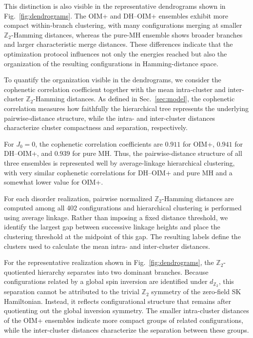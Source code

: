 \documentclass[
reprint,
amsmath,amssymb,
aps,
pre,
floatfix,
]{revtex4-2}
\begin{document}
This distinction is also visible in the representative dendrograms shown in
Fig.~\ref{fig:dendrograms}. The OIM+ and DH--OIM+ ensembles exhibit more
compact within-branch clustering, with many configurations merging at smaller
$\mathbb{Z}_2$-Hamming distances, whereas the pure-MH ensemble shows broader branches and
larger characteristic merge distances. These differences indicate that the
optimization protocol influences not only the energies reached but also the
organization of the resulting configurations in Hamming-distance space.

To quantify the organization visible in the dendrograms, we consider the
cophenetic correlation coefficient together with the mean intra-cluster and
inter-cluster $\mathbb{Z}_2$-Hamming distances. As defined in Sec.~\ref{sec:model},
the cophenetic correlation measures how faithfully the hierarchical tree
represents the underlying pairwise-distance structure, while the intra- and
inter-cluster distances characterize cluster compactness and separation,
respectively.

For $J_0=0$, the cophenetic correlation coefficients are
$0.911$ for OIM+, $0.941$ for DH--OIM+, and $0.939$ for pure MH.
Thus, the pairwise-distance structure of all three ensembles is represented
well by average-linkage hierarchical clustering, with very similar
cophenetic correlations for DH--OIM+ and pure MH and a somewhat lower
value for OIM+.

For each disorder realization, pairwise normalized
$\mathbb{Z}_2$-Hamming distances are computed among all 402 configurations
and hierarchical clustering is performed using average linkage. Rather than
imposing a fixed distance threshold, we identify the largest gap between
successive linkage heights and place the clustering threshold at the midpoint
of this gap. The resulting labels define the clusters used to calculate the
mean intra- and inter-cluster distances.

For the representative realization shown in
Fig.~\ref{fig:dendrograms}, the $\mathbb{Z}_2$-quotiented hierarchy
separates into two dominant branches. Because configurations related by a
global spin inversion are identified under $d_{\mathbb{Z}_2}$, this
separation cannot be attributed to the trivial $\mathbb{Z}_2$ symmetry of
the zero-field SK Hamiltonian. Instead, it reflects configurational
structure that remains after quotienting out the global inversion symmetry.
The smaller intra-cluster distances of the OIM+ ensembles indicate more
compact groups of related configurations, while the inter-cluster
distances characterize the separation between these groups.
\end{document}
